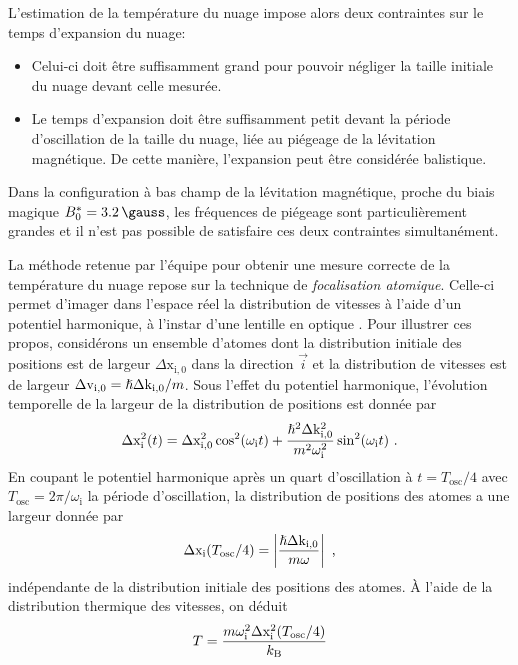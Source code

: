 L'estimation de la température du nuage impose alors deux contraintes sur le temps d'expansion du nuage: 
\begin{itemize}
\item[\textendash] Celui-ci doit être suffisamment grand pour pouvoir négliger la taille initiale du nuage devant celle mesurée.
\item[\textendash] Le temps d'expansion doit être suffisamment petit devant la période d'oscillation de la taille du nuage, liée au piégeage de la lévitation magnétique. De cette manière, l'expansion peut être considérée balistique.
\end{itemize}
Dans la configuration à bas champ de la lévitation magnétique, proche du biais magique $\magicB=\SI{3.2}{\gauss}$, les fréquences de piégeage sont particulièrement grandes et il n'est pas possible de satisfaire ces deux contraintes simultanément. 

La méthode retenue par l'équipe pour obtenir une mesure correcte de la température du nuage repose sur la technique de \emph{focalisation atomique}. Celle-ci permet d'imager dans l'espace réel la distribution de vitesses à l'aide d'un potentiel harmonique, à l'instar d'une lentille en optique \citep{murthy2014matter}. Pour illustrer ces propos, considérons un ensemble d'atomes dont la distribution initiale des positions est de largeur $\Delta\mathrm{x}_{\mathrm{i,0}}$ dans la direction $\vec{i}$ et la distribution de vitesses est de largeur $\Delta\mathrm{v}_{\mathrm{i,0}}=\hslash \Delta\mathrm{k}_{\mathrm{i,0}} /m$. Sous l'effet du potentiel harmonique, l'évolution temporelle de la largeur de la distribution de positions est donnée par
\begin{equation}
\Delta\mathrm{x}_{\mathrm{i}}^2(t)=\Delta\mathrm{x}_{\mathrm{i,0}}^2 \cos^2(\omega_{\mathrm{i}} t) + \frac{\hslash^2 \Delta\mathrm{k}_{\mathrm{i,0}}^2}{m^2 \omega_{\mathrm{i}}^2} \sin^2(\omega_{\mathrm{i}} t) \text{ .}
\end{equation}
En coupant le potentiel harmonique après un quart d'oscillation à $t=T_{\mathrm{osc}}/4$ avec $T_{\mathrm{osc}}= 2\pi/\omega_{\mathrm{i}}$ la période d'oscillation, la distribution de positions des atomes a une largeur donnée par
\begin{equation}
\Delta\mathrm{x}_{\mathrm{i}}(T_{\mathrm{osc}}/4)=\left|\frac{\hslash \Delta\mathrm{k}_{\mathrm{i,0}}}{m \omega}\right| \text{ ,}
\end{equation}
indépendante de la distribution initiale des positions des atomes. À l'aide de la distribution thermique des vitesses, on déduit
\begin{equation}
T=\frac{m \omega_{\mathrm{i}}^2 \Delta \mathrm{x}_{\mathrm{i}}^2(T_{\mathrm{osc}}/4)}{k_{\mathrm{B}}}
\end{equation}

